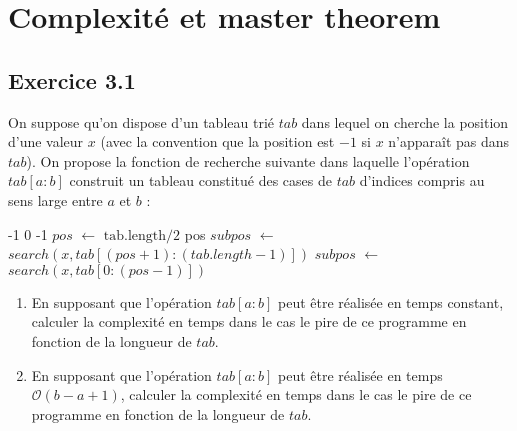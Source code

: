 \documentclass{article}[12pt]
\newcommand*\Let[2]{\State #1 $\gets$ #2}
\begin{document}
\section{Complexité et master theorem}


  \subsection*{Exercice 3.1}
  On suppose qu'on dispose d'un tableau trié $tab$ dans lequel on cherche la position d'une valeur $x$ (avec la convention que la position est $ -1 $ si $x$ n'apparaît pas dans $tab$). On propose la fonction de recherche suivante dans laquelle l'opération $tab[a:b]$ construit un tableau constitué des cases de $tab$ d'indices compris au sens large entre $a$ et $b$ :
  
\begin{tcolorbox}
        \begin{algorithmic}[1]
        \State{} -1
    \EndIf
            \State{} 0
        \Else
        \State {} -1
        \EndIf
    \Else
        \Let{$pos$}{$\text{tab.length/2}$}
            \State {} pos
        \EndIf
            \Let{$subpos$}{$search(x,tab[(pos + 1):(tab.length - 1)])$}
                \State {}
            \Else
                \State {}
            \EndIf
        \Else
            \Let{$subpos$}{$search(x,tab[0:(pos - 1)])$}
                \State {}
            \Else
                \State {}
            \EndIf
            
        \EndIf
    \EndIf
  \EndFunction
  \end{algorithmic}
 \end{tcolorbox} 
  
  
  \begin{enumerate}
      \item En supposant que l'opération $tab[a:b]$ peut être réalisée en temps constant, calculer la complexité en temps dans le cas le pire de ce programme en fonction de la longueur de $tab$.
      \item En supposant que l'opération $tab[a:b]$ peut être réalisée en temps $\mathcal{O}(b-a+1)$, calculer la complexité en temps dans le cas le pire de ce programme en fonction de la longueur de $tab$.
  \end{enumerate}
  
\end{document}
